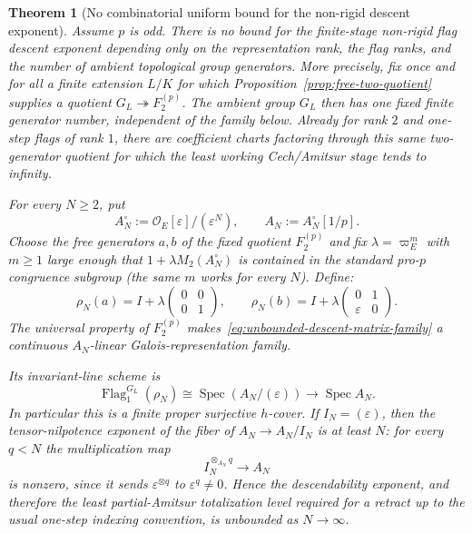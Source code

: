 \documentclass[11pt]{article}
\newtheorem{theorem}{Theorem}[section]
\theoremstyle{definition}
\begin{document}
\begin{theorem}[No combinatorial uniform bound for the non-rigid descent exponent]\label{thm:no-uniform-descent-exponent-bound}
Assume $p$ is odd.  There is no bound for the finite-stage non-rigid flag
descent exponent depending only on the representation rank, the flag ranks, and
the number of ambient topological group generators.  More precisely, fix once
and for all a finite extension $L/K$ for which
Proposition~\ref{prop:free-two-quotient} supplies a quotient
$G_L\twoheadrightarrow F_2^{(p)}$.  The ambient group $G_L$ then has one fixed
finite generator number, independent of the family below.  Already for rank $2$
and one-step flags of rank $1$, there are coefficient charts factoring through
this same two-generator quotient for which the least working Cech/Amitsur stage
tends to infinity.

For every $N\ge2$, put
\[
 A_N^\circ:=\mathcal O_E[\varepsilon]/(\varepsilon^N),
 \qquad
 A_N:=A_N^\circ[1/p].
\]
Choose the free generators $a,b$ of the fixed quotient $F_2^{(p)}$ and fix
$\lambda=\varpi_E^m$ with $m\ge1$ large enough that
$1+\lambda M_2(A_N^\circ)$ is contained in the standard pro-$p$ congruence
subgroup (the same $m$ works for every $N$).  Define:
\begin{equation}\label{eq:unbounded-descent-matrix-family}
 \rho_N(a)
 =I+\lambda
 \begin{pmatrix}0&0\\0&1\end{pmatrix},
 \qquad
 \rho_N(b)
 =I+\lambda
 \begin{pmatrix}0&1\\ \varepsilon&0\end{pmatrix}.
\end{equation}
The universal property of $F_2^{(p)}$ makes~\eqref{eq:unbounded-descent-matrix-family}
a continuous $A_N$-linear Galois-representation family.

Its invariant-line scheme is
\begin{equation}\label{eq:unbounded-descent-flag-scheme}
 \operatorname{Flag}^{G_L}_{1}(\rho_N)
 \cong
 \operatorname{Spec}(A_N/(\varepsilon))
 \longrightarrow \operatorname{Spec}A_N.
\end{equation}
In particular this is a finite proper surjective $h$-cover.  If $I_N=(\varepsilon)$,
then the tensor-nilpotence exponent of the fiber of
$A_N\to A_N/I_N$ is at least $N$: for every $q<N$ the multiplication map
\begin{equation}\label{eq:nilpotent-descent-power-nonzero}
 I_N^{\otimes_{A_N}q}\longrightarrow A_N
\end{equation}
is nonzero, since it sends $\varepsilon^{\otimes q}$ to
$\varepsilon^q\ne0$.  Hence the descendability exponent, and therefore the
least partial-Amitsur totalization level required for a retract up to the usual
one-step indexing convention, is unbounded as $N\to\infty$.


\end{theorem}
\end{document}
